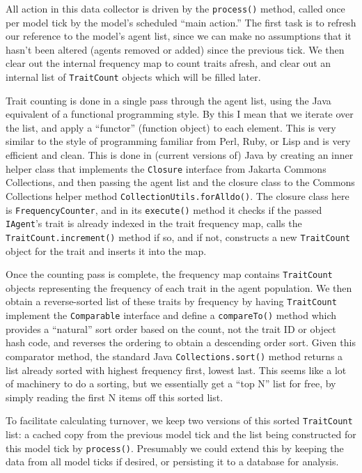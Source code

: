 \documentclass[noid]{kluwer-mem-proposal}
\begin{document}
\begin{article}
All action in this data collector is driven by the \texttt{process()} method,
called once per model tick by the model's scheduled ``main action.''  The first
task is to refresh our reference to the model's agent list, since we can make no
assumptions that it hasn't been altered (agents removed or added) since the
previous tick.  We then clear out the internal frequency map to count traits
afresh, and clear out an internal list of \texttt{TraitCount} objects which will
be filled later.  

Trait counting is done in a single pass through the agent list, using the Java
equivalent of a functional programming style.  By this I mean that we iterate
over the list, and apply a ``functor'' (function object) to each element.  This
is very similar to the style of programming familiar from Perl, Ruby, or Lisp
and is very efficient and clean.  This is done in (current versions of) Java by
creating an inner helper class that implements the \texttt{Closure} interface
from Jakarta Commons Collections, and then passing the agent list and the
closure class to the Commons Collections helper method
\texttt{CollectionUtils.forAlldo()}.  The closure class here is
\texttt{FrequencyCounter}, and in its \texttt{execute()} method it checks if the
passed \texttt{IAgent}'s trait is already indexed in the trait frequency map,
calls the \texttt{TraitCount.increment()} method if so, and if not, constructs a
new \texttt{TraitCount} object for the trait and inserts it into the map.

Once the counting pass is complete, the frequency map contains
\texttt{TraitCount} objects representing the frequency of each trait in the
agent population.  We then obtain a reverse-sorted list of these traits by
frequency by having \texttt{TraitCount} implement the \texttt{Comparable}
interface and define a \texttt{compareTo()} method which provides a ``natural''
sort order based on the count, not the trait ID or object hash code, and
reverses the ordering to obtain a descending order sort.  Given this comparator
method, the standard Java \texttt{Collections.sort()} method returns a list
already sorted with highest frequency first, lowest last.  This seems like a lot
of machinery to do a sorting, but we essentially get a ``top N'' list for free,
by simply reading the first N items off this sorted list.

To facilitate calculating turnover, we keep two versions of this sorted
\texttt{TraitCount} list:  a cached copy from the previous model tick and the
list being constructed for this model tick by \texttt{process()}.  Presumably we
could extend this by keeping the data from all model ticks if desired, or
persisting it to a database for analysis.  


\end{article}
\end{document}
